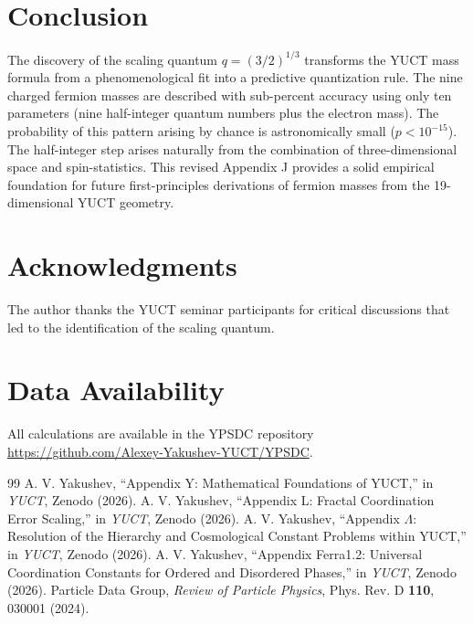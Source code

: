 \documentclass[12pt,a4paper]{article}
\begin{document}
	\section{Conclusion}
	
	The discovery of the scaling quantum \(q = (3/2)^{1/3}\) transforms the YUCT mass formula from a phenomenological fit into a predictive quantization rule. The nine charged fermion masses are described with sub-percent accuracy using only ten parameters (nine half-integer quantum numbers plus the electron mass). The probability of this pattern arising by chance is astronomically small (\(p < 10^{-15}\)). The half-integer step arises naturally from the combination of three-dimensional space and spin-statistics. This revised Appendix J provides a solid empirical foundation for future first-principles derivations of fermion masses from the 19-dimensional YUCT geometry.
	
	\section*{Acknowledgments}
	The author thanks the YUCT seminar participants for critical discussions that led to the identification of the scaling quantum.
	
	\section*{Data Availability}
	All calculations are available in the YPSDC repository \url{https://github.com/Alexey-Yakushev-YUCT/YPSDC}.
	
	\begin{thebibliography}{99}
		 A. V. Yakushev, ``Appendix Y: Mathematical Foundations of YUCT,'' in \emph{YUCT}, Zenodo (2026).
		 A. V. Yakushev, ``Appendix L: Fractal Coordination Error Scaling,'' in \emph{YUCT}, Zenodo (2026).
		 A. V. Yakushev, ``Appendix \(\Lambda\): Resolution of the Hierarchy and Cosmological Constant Problems within YUCT,'' in \emph{YUCT}, Zenodo (2026).
		 A. V. Yakushev, ``Appendix Ferra1.2: Universal Coordination Constants for Ordered and Disordered Phases,'' in \emph{YUCT}, Zenodo (2026).
		 Particle Data Group, \emph{Review of Particle Physics}, Phys. Rev. D \textbf{110}, 030001 (2024).
	\end{thebibliography}
	
\end{document}
